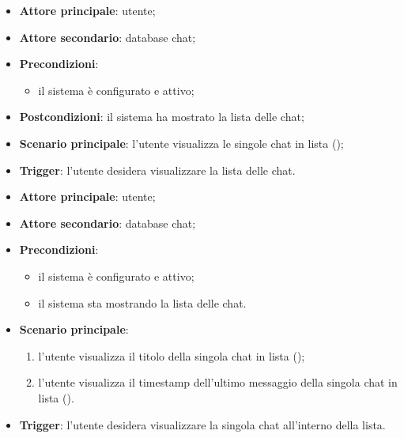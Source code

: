 \documentclass[10pt, a4paper]{article}
\begin{document}
    \begin{itemize}
        \item \textbf{Attore principale}: utente;
        \item \textbf{Attore secondario}: database chat;
        \item \textbf{Precondizioni}:
        \begin{itemize}
            \item il sistema è configurato e attivo;
        \end{itemize}
        \item \textbf{Postcondizioni}: il sistema ha mostrato la lista delle chat;
        \item \textbf{Scenario principale}: l'utente visualizza le singole chat in lista ();
        \item \textbf{Trigger}: l’utente desidera visualizzare la lista delle chat.
    \end{itemize}

    \begin{itemize}
        \item \textbf{Attore principale}: utente;
        \item \textbf{Attore secondario}: database chat;
        \item \textbf{Precondizioni}:
            \begin{itemize}
                \item il sistema è configurato e attivo;
                \item il sistema sta mostrando la lista delle chat.
            \end{itemize}
        \item \textbf{Scenario principale}:
        \begin{enumerate}
            \item l'utente visualizza il titolo della singola chat in lista ();
            \item l'utente visualizza il timestamp dell'ultimo messaggio della singola chat in lista ().
        \end{enumerate}
        \item \textbf{Trigger}: l’utente desidera visualizzare la singola chat all’interno della lista.
    \end{itemize}
\end{document}

